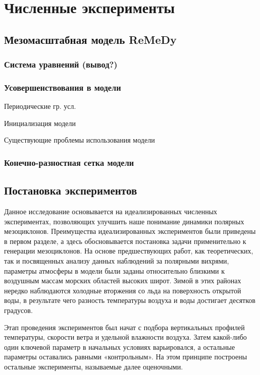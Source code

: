 \documentclass[12pt,a4paper]{report}
\begin{document}
\setcounter{chapter}{3}
\chapter{Численные эксперименты}
\section{Мезомасштабная модель ReMeDy}
\subsection{Система уравнений (вывод?)}
\subsection{Усовершенствования в модели}
\begin{sqlist}
\item Периодические гр. усл.
\item Инициализация модели
\item Существующие проблемы использования модели
\end{sqlist}

\subsection{Конечно-разностная сетка модели}

\section{Постановка экспериментов}
Данное исследование основывается на идеализированных численных экспериментах, позволяющих улучшить наше понимание динамики полярных мезоциклонов. Преимущества идеализированных экспериментов были приведены в первом разделе, а здесь обосновывается постановка задачи применительно к генерации мезоциклонов.
На основе предшествующих работ, как теоретических, так и посвященных анализу данных наблюдений за полярными вихрями, параметры атмосферы в модели были заданы относительно близкими к воздушным массам морских областей высоких широт. Зимой в этих районах нередко наблюдаются холодные вторжения со льда на поверхность открытой воды, в результате чего разность температуры воздуха и воды  достигает десятков градусов.

Этап проведения экспериментов был начат с подбора вертикальных профилей температуры, скорости ветра и удельной влажности воздуха. Затем какой-либо один ключевой параметр в начальных условиях варьировался, а остальные параметры оставались равными «контрольным». На этом принципе построены остальные эксперименты, называемые далее оценочными.
\end{document}
